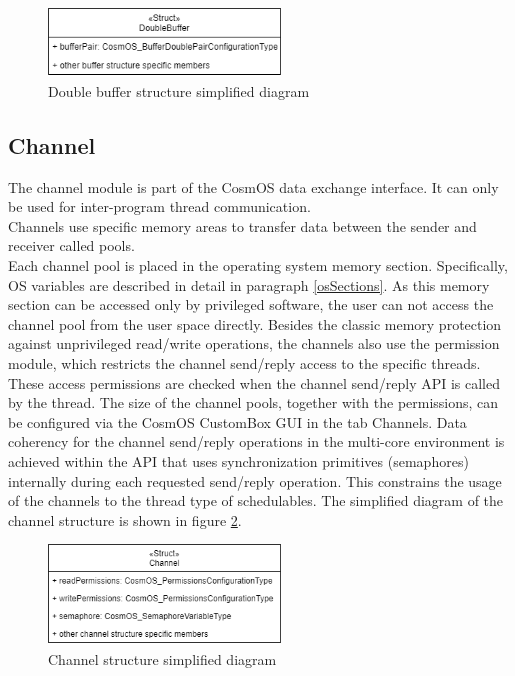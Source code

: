 \begin{figure}[H]
\begin{center}
\includegraphics[width=0.55\textwidth]{images/doubleBuffer_structure.png}
\caption{Double buffer structure simplified diagram}
\label{fig:doubleBufferStructure}
\end{center}
\end{figure}

\subsection{Channel}
The channel module is part of the CosmOS data exchange interface. It can only be used for inter-program thread communication.\\
\indent Channels use specific memory areas to transfer data between the sender and receiver called pools. \\
\indent Each channel pool is placed in the operating system memory section. Specifically, \ac{OS} variables are described in detail in paragraph \ref{osSections}. As this memory section can be accessed only by privileged software, the user can not access the channel pool from the user space directly. Besides the classic memory protection against unprivileged read/write operations, the channels also use the permission module, which restricts the channel send/reply access to the specific threads. These access permissions are checked when the channel send/reply \ac{API} is called by the thread. The size of the channel pools, together with the permissions, can be configured via the CosmOS CustomBox \ac{GUI} in the tab Channels. Data coherency for the channel send/reply operations in the multi-core environment is achieved within the \ac{API} that uses synchronization primitives (semaphores) internally during each requested send/reply operation. This constrains the usage of the channels to the thread type of schedulables.
The simplified diagram of the channel structure is shown in figure \ref{fig:channelStructure}.
\begin{figure}[H]
\begin{center}
\includegraphics[width=0.55\textwidth]{images/channel_structure.png}
\caption{Channel structure simplified diagram}
\label{fig:channelStructure}
\end{center}
\end{figure}

